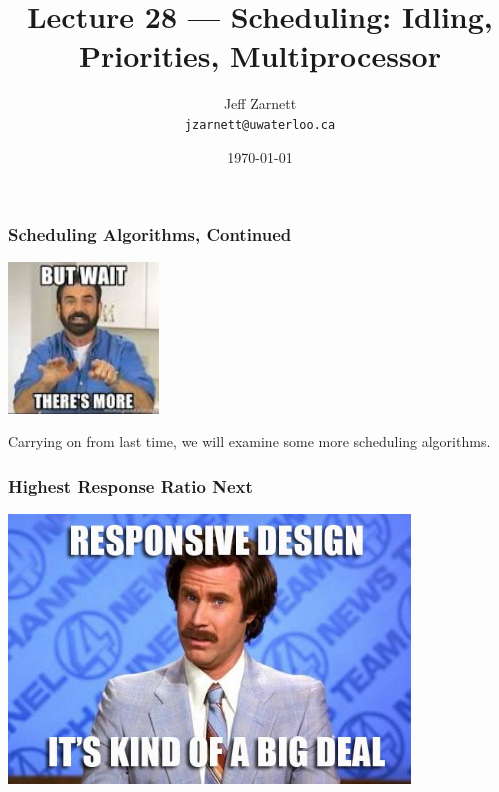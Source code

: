 

\title{Lecture 28 --- Scheduling: Idling, Priorities, Multiprocessor }

\author{Jeff Zarnett \\ \small \texttt{jzarnett@uwaterloo.ca}}
\date{\today}




\begin{frame}
  \titlepage

 \end{frame}



\begin{frame}
\frametitle{Scheduling Algorithms, Continued}

\begin{center}
	\includegraphics[width=0.3\textwidth]{images/theresmore.jpg}
\end{center}

Carrying on from last time, we will examine some more scheduling algorithms.

\end{frame}

\begin{frame}
\frametitle{Highest Response Ratio Next}

\begin{center}
	\includegraphics[width=0.8\textwidth]{images/responsive.jpg}
\end{center}

\end{frame}

